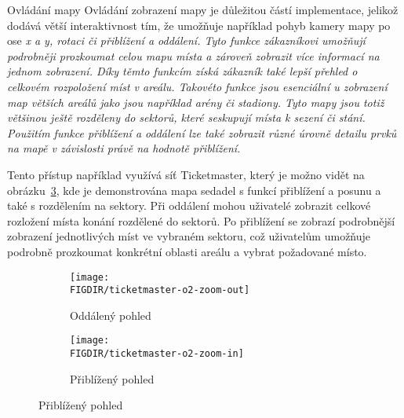 \begin{subsection}{Ovládání mapy}
    \label{subsec:identifikace-interaktivni-mapa-ovladani}
    Ovládání zobrazení mapy je důležitou částí implementace, jelikož dodává větší interaktivnost tím, že umožňuje například pohyb kamery mapy po ose \em{x} a \em{y}, rotaci či přiblížení a oddálení.
    Tyto funkce zákazníkovi umožňují podrobněji prozkoumat celou mapu místa a zároveň zobrazit více informací na jednom zobrazení.
    Díky těmto funkcím získá zákazník také lepší přehled o celkovém rozpoložení míst v areálu.
    Takovéto funkce jsou esenciální u zobrazení map větších areálů jako jsou například arény či stadiony.
    Tyto mapy jsou totiž většinou ještě rozděleny do sektorů, které seskupují místa k sezení či stání.
    Použitím funkce přiblížení a oddálení lze také zobrazit různé úrovně detailu prvků na mapě v závislosti právě na hodnotě přiblížení.

    Tento přístup například využívá síť Ticketmaster, který je možno vidět na obrázku~\ref{fig:ticketmaster-o2-zoom}, kde je demonstrována mapa sedadel s funkcí přiblížení a posunu a také s rozdělením na sektory.
    Při oddálení mohou uživatelé zobrazit celkové rozložení místa konání rozdělené do sektorů.
    Po přiblížení se zobrazí podrobnější zobrazení jednotlivých míst ve vybraném sektoru, což uživatelům umožňuje podrobně prozkoumat konkrétní oblasti areálu a vybrat požadované místo.

    \begin{figure}[H]
        \centering
        \caption{Různé pohledy mapy v síti Ticketmaster}
        \begin{subfigure}{0.8\textwidth}
            \texttt{[image: \\FIGDIR/ticketmaster-o2-zoom-out]}
            \caption{Oddálený pohled}
            \label{fig:ticketmaster-o2-zoom-in}
        \end{subfigure}
        \hfill
        \begin{subfigure}{0.8\textwidth}
            \texttt{[image: \\FIGDIR/ticketmaster-o2-zoom-in]}
            \caption{Přiblížený pohled}
            \label{fig:ticketmaster-o2-zoom-out}
        \end{subfigure}
        \label{fig:ticketmaster-o2-zoom}
    \end{figure}


\end{subsection}
